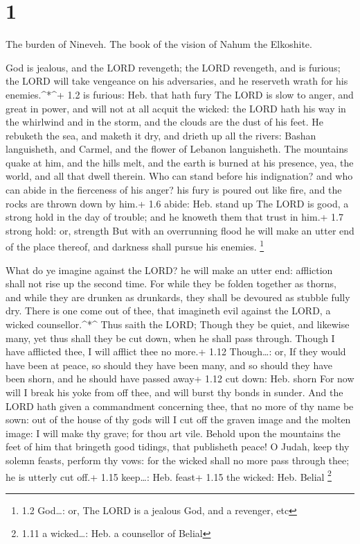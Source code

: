 \hypertarget{section}{%
\section{1}\label{section}}

 The burden of Nineveh. The book of the vision of Nahum the
Elkoshite.

 God is jealous, and the LORD revengeth; the LORD revengeth,
and is furious; the LORD will take vengeance on his adversaries, and he
reserveth wrath for his enemies.\^{}*\^{}+ 1.2 is furious: Heb. that
hath fury  The LORD is slow to anger, and great in power,
and will not at all acquit the wicked: the LORD hath his way in the
whirlwind and in the storm, and the clouds are the dust of his feet.
 He rebuketh the sea, and maketh it dry, and drieth up all
the rivers: Bashan languisheth, and Carmel, and the flower of Lebanon
languisheth.  The mountains quake at him, and the hills
melt, and the earth is burned at his presence, yea, the world, and all
that dwell therein.  Who can stand before his indignation?
and who can abide in the fierceness of his anger? his fury is poured out
like fire, and the rocks are thrown down by him.+ 1.6 abide: Heb. stand
up  The LORD is good, a strong hold in the day of trouble;
and he knoweth them that trust in him.+ 1.7 strong hold: or, strength
 But with an overrunning flood he will make an utter end of
the place thereof, and darkness shall pursue his enemies. \footnote{1.2
  God\ldots: or, The LORD is a jealous God, and a revenger, etc}

 What do ye imagine against the LORD? he will make an utter
end: affliction shall not rise up the second time.  For
while they be folden together as thorns, and while they are drunken as
drunkards, they shall be devoured as stubble fully dry. 
There is one come out of thee, that imagineth evil against the LORD, a
wicked counsellor.\^{}*\^{}  Thus saith the LORD; Though
they be quiet, and likewise many, yet thus shall they be cut down, when
he shall pass through. Though I have afflicted thee, I will afflict thee
no more.+ 1.12 Though\ldots: or, If they would have been at peace, so
should they have been many, and so should they have been shorn, and he
should have passed away+ 1.12 cut down: Heb. shorn  For now
will I break his yoke from off thee, and will burst thy bonds in sunder.
 And the LORD hath given a commandment concerning thee,
that no more of thy name be sown: out of the house of thy gods will I
cut off the graven image and the molten image: I will make thy grave;
for thou art vile.  Behold upon the mountains the feet of
him that bringeth good tidings, that publisheth peace! O Judah, keep thy
solemn feasts, perform thy vows: for the wicked shall no more pass
through thee; he is utterly cut off.+ 1.15 keep\ldots: Heb. feast+ 1.15
the wicked: Heb. Belial \footnote{1.11 a wicked\ldots: Heb. a counsellor
  of Belial}

